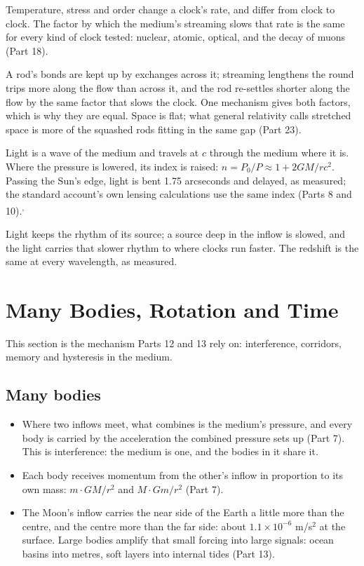  Temperature, stress and order change a clock's rate, and differ from clock to clock. The factor by which the medium's streaming slows that rate is the same for every kind of clock tested: nuclear, atomic, optical, and the decay of muons (Part 18).

 A rod's bonds are kept up by exchanges across it; streaming lengthens the round trips more along the flow than across it, and the rod re-settles shorter along the flow by the same factor that slows the clock. One mechanism gives both factors, which is why they are equal. Space is flat; what general relativity calls stretched space is more of the squashed rods fitting in the same gap (Part 23).

 Light is a wave of the medium and travels at $c$ through the medium where it is. Where the pressure is lowered, its index is raised: $n = P_0/P \approx 1 + 2GM/rc^2$. Passing the Sun's edge, light is bent 1.75 arcseconds and delayed, as measured; the standard account's own lensing calculations use the same index (Parts 8 and 10).\textsuperscript{,}

 Light keeps the rhythm of its source; a source deep in the inflow is slowed, and the light carries that slower rhythm to where clocks run faster. The redshift is the same at every wavelength, as measured.

\section{Many Bodies, Rotation and Time}

This section is the mechanism Parts 12 and 13 rely on: interference, corridors, memory and hysteresis in the medium.

\subsection{Many bodies}

\begin{itemize}
\item {} Where two inflows meet, what combines is the medium's pressure, and every body is carried by the acceleration the combined pressure sets up (Part 7). This is interference: the medium is one, and the bodies in it share it.
\item {} Each body receives momentum from the other's inflow in proportion to its own mass: $m \cdot GM/r^2$ and $M \cdot Gm/r^2$ (Part 7).
\item {} The Moon's inflow carries the near side of the Earth a little more than the centre, and the centre more than the far side: about $1.1\times10^{-6}$ m/s$^2$ at the surface. Large bodies amplify that small forcing into large signals: ocean basins into metres, soft layers into internal tides (Part 13).
\end{itemize}

